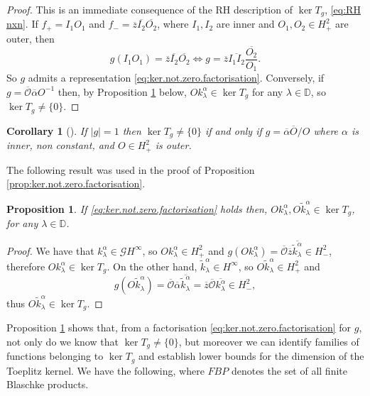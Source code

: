 \documentclass[12pt]{elsarticle}
\numberwithin{equation}{section}
\theoremstyle{plain}
\newtheorem{prop}[thm]{Proposition}
\newtheorem{cor}[thm]{Corollary}
\newcommand{\Hp}{\ensuremath{H^2_+}}
\newcommand{\Hm}{\ensuremath{H^2_-}}
\newcommand{\Hinf}{\ensuremath{H^\infty}}
\newcommand{\DD}{\ensuremath{\mathbb{D}}}
\newcommand{\OO}{\ensuremath{\mathcal{O}}}
\newcommand{\GG}{\ensuremath{\mathcal{G}}}
\newcommand{\ol}[1]{\ensuremath{\overline{#1}}}
\newcommand{\zero}{\ensuremath{\{0\}}}
\begin{document}
\begin{proof}
This is an immediate consequence of the RH description of $\ker T_g$, \eqref{eq:RH nxn}.
If $f_+ = I_1 O_1$ and $f_- = \ol z \ol{I_2} \ol{O_2}$, where $I_1,I_2$ are inner and $O_1,O_2\in\Hp$ are outer, then
\[
g(I_1 O_1) = \ol z \ol{I_2}\ol{O_2} \iff g = \ol z \ol{I_1 I_2} \frac{\ol{O_2}}{O_1}.
\]
So $g$ admits a representation \eqref{eq:ker.not.zero.factorisation}.
Conversely, if $g= \ol\OO \ol\alpha O^{-1}$ then, by Proposition \ref{prop:O.k,O.ktil-in-the-kernel} below, $O k_\lambda^\alpha \in \ker T_g$ for any $\lambda \in\DD$, so $\ker T_g \neq\zero$.
\end{proof}


\begin{cor}[{\cite[Lemma 3.2]{MaPol05}}]
\label{cor:ker.not.zero.factorisation.unimodular}
If $|g|=1$ then $\ker T_g\neq\zero$ if and only if $g=\ol \alpha \ol O / O$ where $\alpha$ is inner, non constant, and $O\in\Hp$ is outer.
\end{cor}

The following result was used in the proof of Proposition \ref{prop:ker.not.zero.factorisation}.


\begin{prop}
\label{prop:O.k,O.ktil-in-the-kernel}
If \eqref{eq:ker.not.zero.factorisation} holds then, $O k_\lambda^\alpha, O \tilde k_\lambda^\alpha \in \ker T_g$, for any $\lambda\in\DD$.
\end{prop}

\begin{proof}
We have that $k_\lambda^\alpha\in\GG\Hinf$, so $O k_\lambda^\alpha \in \Hp$ and $g(O k_\lambda^\alpha) = \ol \OO \ol z \ol{\tilde k_\lambda^\alpha} \in \Hm$,
therefore $O k_\lambda^\alpha \in \ker T_g$.
On the other hand, $\tilde k_\lambda^\alpha \in \Hinf$, so $O \tilde k_\lambda^\alpha \in \Hp$ and 
\begin{equation}
\label{eq:proof.O.ktil-in-the-kernel}
g (O \tilde k_\lambda^\alpha) = \ol\OO \ol\alpha \ol{\tilde k_\lambda^\alpha} = \ol z \ol\OO \ol{k_\lambda^\alpha} \in \Hm,
\end{equation}
thus $O \tilde k_\lambda^\alpha \in \ker T_g$.
\end{proof}


Proposition \ref{prop:O.k,O.ktil-in-the-kernel} shows that, from a factorisation \eqref{eq:ker.not.zero.factorisation} for $g$, not only do we know that $\ker T_g\neq\zero$, but moreover we can identify families of functions belonging to $\ker T_g$ and establish lower bounds for the dimension of the Toeplitz kernel.
We have the following, where $FBP$ denotes the set of all finite Blaschke products.
\end{document}
